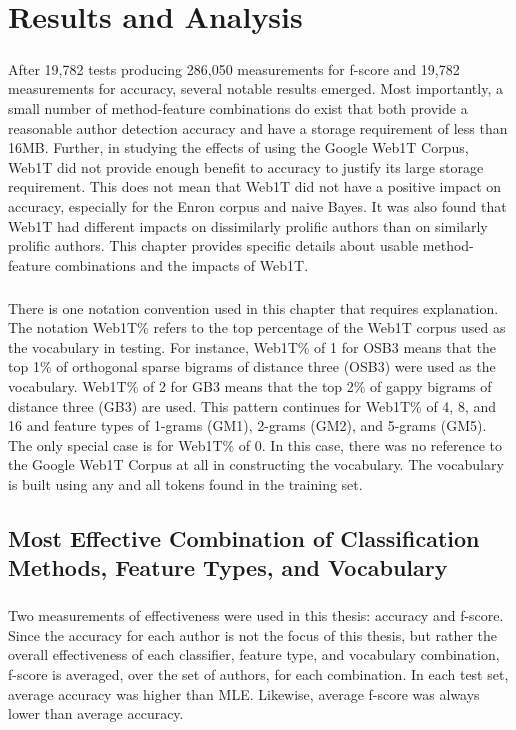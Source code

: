 \chapter{Results and Analysis}

	\paragraph*{} After 19,782 tests producing 286,050 measurements for f-score and 19,782 measurements for accuracy, several notable results emerged.  Most importantly, a small number of method-feature combinations do exist that both provide a reasonable author detection accuracy and have a storage requirement of less than 16MB.  Further, in studying the effects of using the Google Web1T Corpus, Web1T did not provide enough benefit to accuracy to justify its large storage requirement.  This does not mean that Web1T did not have a positive impact on accuracy, especially for the Enron corpus and naive Bayes.  It was also found that Web1T had different impacts on dissimilarly prolific authors than on similarly prolific authors. This chapter provides specific details about usable method-feature combinations and the impacts of Web1T.
	\paragraph*{} There is one notation convention used in this chapter that requires explanation.  The notation Web1T\% refers to the top percentage of the Web1T corpus used as the vocabulary in testing.  For instance, Web1T\% of 1 for OSB3 means that the top 1\% of orthogonal sparse bigrams of distance three (OSB3) were used as the vocabulary.  Web1T\% of 2 for GB3 means that the top 2\% of gappy bigrams of distance three (GB3) are used.  This pattern continues for Web1T\% of 4, 8, and 16 and feature types of 1-grams (GM1), 2-grams (GM2), and 5-grams (GM5).  The only special case is for Web1T\% of 0.  In this case, there was no reference to the Google Web1T Corpus at all in constructing the vocabulary.  The vocabulary is built using any and all tokens found in the training set.

\begin{singlespace}
\section{Most Effective Combination of Classification Methods, Feature Types, and Vocabulary}
\end{singlespace}
	\paragraph*{} Two measurements of effectiveness were used in this thesis: accuracy and f-score.  Since the accuracy for each author is not the focus of this thesis, but rather the overall effectiveness of each classifier, feature type, and vocabulary combination, f-score is averaged, over the set of authors, for each combination.  In each test set, average accuracy was higher than MLE.  Likewise, average f-score was always lower than average accuracy.


